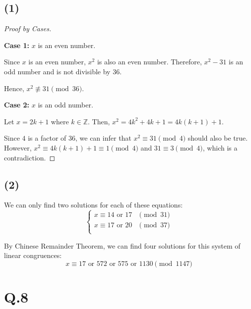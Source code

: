 \documentclass[a4paper,12pt]{article}
\begin{document}
\subsection*{(1)}

\begin{proof}[Proof by Cases]
$ $

\textbf{Case 1:} $x$ is an even number.

Since $x$ is an even number, $x^2$ is also an even number.
Therefore, $x^2 - 31$ is an odd number and is not divisible by $36$.

Hence, $x^2 \not\equiv 31 \pmod{36}$.

\textbf{Case 2:} $x$ is an odd number.

Let $x = 2k + 1$ where $k \in \mathbb{Z}$.
Then, $x^2 = 4k^2 + 4k + 1 = 4k(k + 1) + 1$.

Since $4$ is a factor of $36$, we can infer that $x^2 \equiv 31 \pmod{4}$ should also be true.
However, $x^2 \equiv 4k(k + 1) + 1 \equiv 1 \pmod{4}$ and $31 \equiv 3 \pmod{4}$, which is a contradiction.
\end{proof}

\subsection*{(2)}

We can only find two solutions for each of these equations:
\begin{equation*}
	\begin{cases}
		x \equiv 14 \text{ or } 17 &\pmod{31} \\
		x \equiv 17 \text{ or } 20 &\pmod{37} \\
	\end{cases}
\end{equation*}

By Chinese Remainder Theorem, we can find four solutions for this system of linear congruences:
\begin{equation*}
	x \equiv 17 \text{ or } 572 \text{ or } 575 \text{ or } 1130 \pmod{1147}
\end{equation*}
\section*{Q.8}
\end{document}
